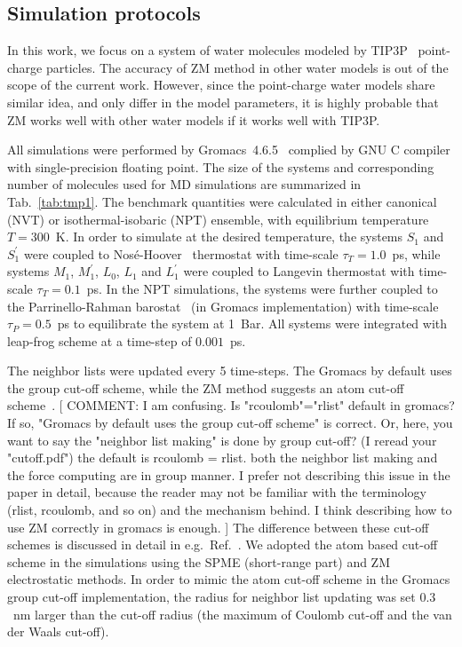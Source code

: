 \documentclass[a4paper,preprint,unsortedaddress,onecolumn,fleqn]{revtex4}
\newcommand{\recheck}[1]{{\color{red} #1}}
\begin{document}
\subsection{Simulation protocols}

\label{sec:protocols} In this work, we focus on a system of water molecules
modeled by TIP3P~\cite{jorgensen1983comparison} point-charge particles. 
The accuracy of ZM method in other water models is out of the scope of the
current work. However, since the point-charge water models share similar
idea, and only differ in the model parameters, it is highly probable that ZM
works well with other water models if it works well with TIP3P.

All simulations were performed by Gromacs~4.6.5~\cite{hess2008gromacs,
pronk2013gromacs} complied by GNU C compiler with single-precision floating
point. The size of the systems and corresponding number of molecules used
for MD simulations are summarized in Tab.~\ref{tab:tmp1}. The benchmark
quantities were calculated in either canonical (NVT) or isothermal-isobaric
(NPT) ensemble, with equilibrium temperature $T=300$~K. In order to simulate
at the desired temperature, the systems $S_{1}$ and $S_{1}^{\prime }$ were
coupled to Nos\'{e}-Hoover~\cite{nose1984molecular,hoover1985canonical}
thermostat with time-scale $\tau _{T}=1.0$~ps, while systems $M_{1}$, $%
M_{1}^{\prime }$, $L_{0}$, $L_{1}$ and $L_{1}^{\prime }$ were coupled to
Langevin thermostat with time-scale $\tau _{T}=0.1$~ps. In the NPT
simulations, the systems were further coupled to the Parrinello-Rahman
barostat~\cite{parrinello1980crystal,parrinello1981polymorphic} (in Gromacs
implementation) with time-scale $\tau _{P}=0.5$~ps to equilibrate the system
at 1~Bar. All systems were integrated with leap-frog scheme at a time-step
of $0.001$~ps.

The neighbor lists were updated every 5 time-steps. {\color{red} The Gromacs
by default uses the group cut-off scheme, while the ZM method suggests an
atom cut-off scheme~\cite{fukuda2011molecular,fukuda2013zero}.} [{%
\color{blue} COMMENT: I am confusing. Is "rcoulomb"="rlist" default in
gromacs? If so, "Gromacs by default uses the group cut-off scheme" is
correct. Or, here, you want to say the "neighbor list making" is done by
group cut-off? (I reread your "cutoff.pdf")} \recheck{the default is rcoulomb = rlist. both
the neighbor list making and the force computing are in group manner.
I prefer not describing this issue in the paper in detail, because the reader
may not be familiar with the terminology (rlist, rcoulomb, and so on) and
the mechanism behind. I think describing how to use ZM correctly in gromacs is enough.
}] The difference between these
cut-off schemes is discussed in detail in e.g.~Ref.~\cite%
{hunenberger1998alternative,baumketner2009removing}. We adopted the atom
based cut-off scheme in the simulations using the SPME (short-range part)
and ZM electrostatic methods. In order to mimic the atom cut-off scheme in
the Gromacs group cut-off implementation, the radius for neighbor list
updating was set ${0.3}$~nm larger than the cut-off radius (the maximum of
Coulomb cut-off and the van der Waals cut-off). 
\end{document}
